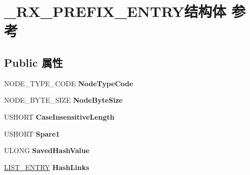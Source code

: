 \hypertarget{struct___r_x___p_r_e_f_i_x___e_n_t_r_y}{}\section{\+\_\+\+R\+X\+\_\+\+P\+R\+E\+F\+I\+X\+\_\+\+E\+N\+T\+R\+Y结构体 参考}
\label{struct___r_x___p_r_e_f_i_x___e_n_t_r_y}
\subsection*{Public 属性}
\begin{DoxyCompactItemize}
\item 
\mbox{\label{struct___r_x___p_r_e_f_i_x___e_n_t_r_y_a3752de8093cc20a97beb3d56da9135e9}} 
N\+O\+D\+E\+\_\+\+T\+Y\+P\+E\+\_\+\+C\+O\+DE {\bfseries Node\+Type\+Code}
\item 
\mbox{\label{struct___r_x___p_r_e_f_i_x___e_n_t_r_y_aab6f79df4933d9393a583837bd5f547e}} 
N\+O\+D\+E\+\_\+\+B\+Y\+T\+E\+\_\+\+S\+I\+ZE {\bfseries Node\+Byte\+Size}
\item 
\mbox{\label{struct___r_x___p_r_e_f_i_x___e_n_t_r_y_a03d8eafe3ba67cd252d7b26dd2616273}} 
U\+S\+H\+O\+RT {\bfseries Case\+Insensitive\+Length}
\item 
\mbox{\label{struct___r_x___p_r_e_f_i_x___e_n_t_r_y_a9f3aa8b42a5196c522de5b0ff6d5005e}} 
U\+S\+H\+O\+RT {\bfseries Spare1}
\item 
\mbox{\label{struct___r_x___p_r_e_f_i_x___e_n_t_r_y_af8bbe3b034fbc42cbd1f5430c6544165}} 
U\+L\+O\+NG {\bfseries Saved\+Hash\+Value}
\item 
\mbox{\label{struct___r_x___p_r_e_f_i_x___e_n_t_r_y_a4a3b3cb0d8a3818b7e7e077ba7483d79}} 
\hyperlink{struct___l_i_s_t___e_n_t_r_y}{L\+I\+S\+T\+\_\+\+E\+N\+T\+RY} {\bfseries Hash\+Links}
\item 
\mbox{\label{struct___r_x___p_r_e_f_i_x___e_n_t_r_y_a1de79c95911bb749bb1529abedb19ca6}} 

\end{DoxyCompactItemize}
